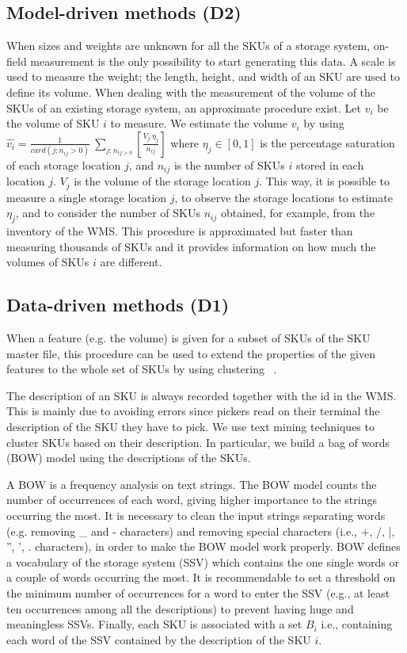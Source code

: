 \subsection{Model-driven methods (D2)}
When sizes and weights are unknown for all the SKUs of a storage system, on-field measurement is the only possibility to start generating this data. A scale is used to measure the weight; the length, height, and width of an SKU are used to define its volume. When dealing with the measurement of the volume of the SKUs of an existing storage system, an approximate procedure exist. Let $v_i$ be the volume of SKU $i$ to measure. We estimate the volume $v_i$ by using  $\widehat{v_i}=\frac{1}{card(j:n_{ij}>0)}\ \sum_{j:n_{ij>0}}\left[\frac{V_j\ \eta_j}{n_{ij}}\right]$ where  $\eta_j\in[0,1]$ is the percentage saturation of each storage location $j$, and $n_{ij}$ is the number of SKUs $i$ stored in each location $j$. $V_j$ is the volume of the storage location $j$. This way, it is possible to measure a single storage location $j$, to observe the storage locations to estimate $\eta_j$, and to consider the number of SKUs $n_{ij}$ obtained, for example, from the inventory of the WMS. This procedure is approximated but faster than measuring thousands of SKUs and it provides information on how much the volumes of SKUs $i$ are different.

\subsection{Data-driven methods (D1)}
When a feature (e.g. the volume) is given for a subset of SKUs of the SKU master file, this procedure can be used to extend the properties of the given features to the whole set of SKUs by using clustering ~\cite{Tufano2019}.\par

The description of an SKU is always recorded together with the id in the WMS. This is mainly due to avoiding errors since pickers read on their terminal the description of the SKU they have to pick. We use text mining techniques to cluster SKUs based on their description. In particular, we build a bag of words (BOW) model using the descriptions of the SKUs.\par

A BOW is a frequency analysis on text strings. The BOW model counts the number of occurrences of each word, giving higher importance to the strings occurring the most. It is necessary to clean the input strings separating words (e.g. removing \_ and - characters) and removing special characters (i.e., +, /, |, ”,  ’, . characters), in order to make the BOW model work properly. BOW defines a vocabulary of the storage system (SSV) which contains the one single words or a couple of words occurring the most. It is recommendable to set a threshold on the minimum number of occurrences for a word to enter the SSV (e.g., at least ten occurrences among all the descriptions) to prevent having huge and meaningless SSVs. Finally, each SKU is associated with a set $B_i$ i.e., containing each word of the SSV contained by the description of the SKU $i$.\par

